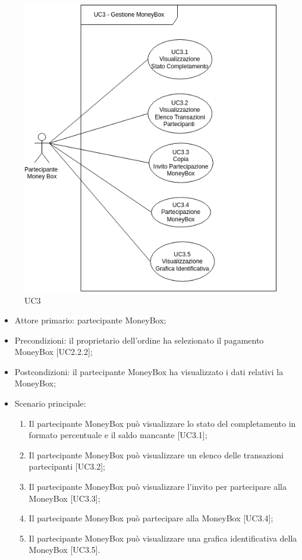 \begin{figure}[H]
    \centering
    \includegraphics[scale=0.7]{immagini/UC3.png}
    \caption{UC3}
\end{figure}

\begin{itemize}
    \item Attore primario: partecipante MoneyBox\glo{};
    \item Precondizioni: il proprietario dell'ordine ha selezionato il pagamento MoneyBox\glo{} [UC2.2.2];
    \item Postcondizioni: il partecipante MoneyBox\glo{} ha visualizzato i dati relativi la MoneyBox\glo{};
    \item Scenario principale:
          \begin{enumerate}
                \item Il partecipante MoneyBox\glo{} può visualizzare lo stato del completamento in formato percentuale e il saldo mancante [UC3.1];
                \item Il partecipante MoneyBox\glo{} può visualizzare un elenco delle transazioni partecipanti [UC3.2];
                \item Il partecipante MoneyBox\glo{} può visualizzare l'invito per partecipare alla MoneyBox\glo{} [UC3.3];
                \item Il partecipante MoneyBox\glo{} può partecipare alla MoneyBox\glo{} [UC3.4];
                \item Il partecipante MoneyBox\glo{} può visualizzare una grafica identificativa della MoneyBox\glo{} [UC3.5].
    \end{enumerate}
\end{itemize}

